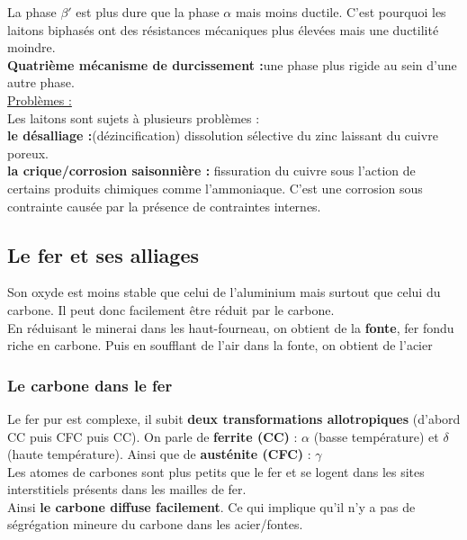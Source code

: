 \documentclass[../main.tex]{subfiles}
\begin{document}
La phase $\beta'$ est plus dure que la phase $\alpha$ mais moins ductile. C'est pourquoi les laitons biphasés ont des résistances mécaniques plus élevées mais une ductilité moindre.\\

\textbf{Quatrième mécanisme de durcissement :}une phase plus rigide au sein d'une autre phase.\\

\quad \underline{Problèmes :}\\
Les laitons sont sujets à plusieurs problèmes : \\
\textbf{le désalliage :}(dézincification) dissolution sélective du zinc laissant du cuivre poreux.\\
\textbf{la crique/corrosion saisonnière :} fissuration du cuivre sous l'action de certains produits chimiques comme l'ammoniaque. C'est une corrosion sous contrainte causée par la présence de contraintes internes.\\

\subsection{Le fer et ses alliages}
Son oxyde est moins stable que celui de l'aluminium mais surtout que celui du carbone. Il peut donc facilement être réduit par le carbone.\\
En réduisant le minerai dans les haut-fourneau, on obtient de la \textbf{fonte}, fer fondu riche en carbone. Puis en soufflant de l'air dans la fonte, on obtient de l'acier\\

\subsubsection{Le carbone dans le fer}
Le fer pur est complexe, il subit \textbf{deux transformations allotropiques} (d'abord CC puis CFC puis CC). On parle de \textbf{ferrite (CC)} : $\alpha$ (basse température) et $\delta$ (haute température). Ainsi que de \textbf{austénite (CFC)} : $\gamma$\\

Les atomes de carbones sont plus petits que le fer et se logent dans les sites interstitiels présents dans les mailles de fer.\\
Ainsi \textbf{le carbone diffuse facilement}. Ce qui implique qu'il n'y a pas de ségrégation mineure du carbone dans les acier/fontes.\\
\end{document}
